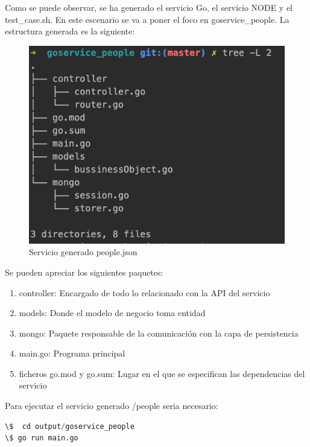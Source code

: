 \documentclass[a4paper,11pt]{book}
\begin{document}
Como se puede observar, se ha generado el servicio Go, el servicio NODE y el test\_case.sh. En este escenario se va a poner el foco en goservice\_people. La estructura generada es la siguiente:

\begin{figure}[H]  
\centering 
\includegraphics[scale=0.35]{imagenes/t12.png}
\caption{ Servicio generado people.json}  
\end{figure}

Se pueden apreciar los siguientes paquetes:

\begin{enumerate}
\item controller: Encargado de todo lo relacionado con la API del servicio
\item models: Donde el modelo de negocio toma entidad
\item mongo: Paquete responsable de la comunicación con la capa de persistencia
\item main.go: Programa principal
\item ficheros go.mod y go.sum: Lugar en el que se especifican las dependencias del servicio
\end{enumerate}

Para ejecutar el servicio generado /people seria necesario: 


\begin{lstlisting}[language=python,caption={ Ejemplo Ejecución /people }]
\$  cd output/goservice_people
\$ go run main.go
\end{lstlisting} 
\end{document}
